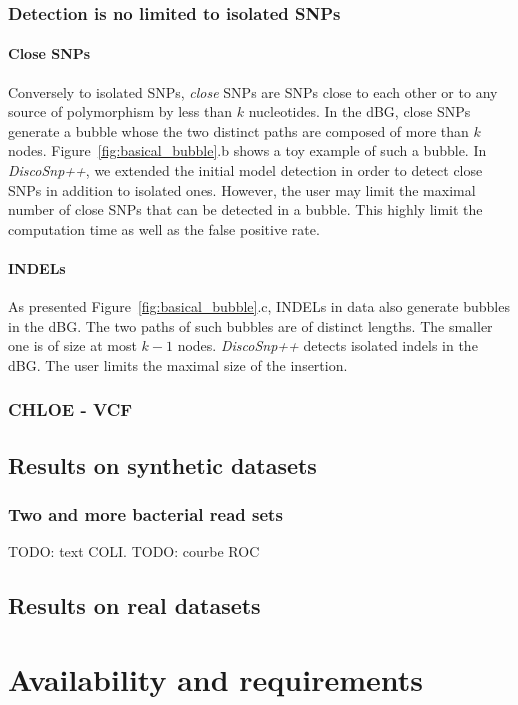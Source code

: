 \documentclass{bmcart}
\newcommand{\discopp}{{\it DiscoSnp++}\xspace}
\begin{document}
\subsubsection*{Detection is no limited to isolated SNPs}

\paragraph{Close SNPs}
Conversely to isolated SNPs, \emph{close} SNPs are SNPs close to each other or to any source of polymorphism by less than $k$ nucleotides.
In the dBG, close SNPs generate a bubble whose the two distinct paths are composed of more than $k$ nodes. Figure~\ref{fig:basical_bubble}.b shows a toy example of such a bubble.  
In \discopp, we extended the initial model detection in order to detect close SNPs in addition to isolated ones. However, the user may limit the maximal number of close SNPs that can be detected in a bubble. This highly limit the computation time as well as the false positive rate. 

\paragraph{INDELs}
As presented Figure~\ref{fig:basical_bubble}.c, INDELs in data also generate bubbles in the dBG. The two paths of such bubbles are of distinct lengths. The smaller one is of size at most $k-1$ nodes. \discopp detects isolated indels in the dBG. The user limits the maximal size of the insertion. 

\subsubsection*{CHLOE - VCF}

\subsection*{Results on synthetic datasets}
\subsubsection*{Two and more bacterial read sets}
TODO: text COLI. 
TODO: courbe ROC 


\subsection*{Results on real datasets}


\section*{Availability and requirements}
\end{document}
